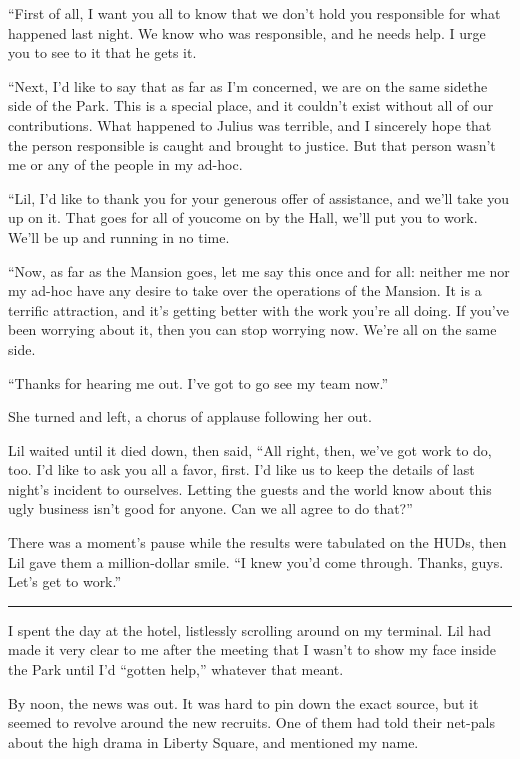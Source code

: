 “First of all, I want you all to know that we don't hold you
responsible for what happened last night. We know who was
responsible, and he needs help. I urge you to see to it that he
gets it.

“Next, I'd like to say that as far as I'm concerned, we are on the
same side{\dash}the side of the Park. This is a special place, and it
couldn't exist without all of our contributions. What happened to
Julius was terrible, and I sincerely hope that the person
responsible is caught and brought to justice. But that person
wasn't me or any of the people in my ad-hoc.

“Lil, I'd like to thank you for your generous offer of assistance,
and we'll take you up on it. That goes for all of you{\dash}come on by
the Hall, we'll put you to work. We'll be up and running in no
time.

“Now, as far as the Mansion goes, let me say this once and for all:
neither me nor my ad-hoc have any desire to take over the
operations of the Mansion. It is a terrific attraction, and it's
getting better with the work you're all doing. If you've been
worrying about it, then you can stop worrying now. We're all on the
same side.

“Thanks for hearing me out. I've got to go see my team now.”

She turned and left, a chorus of applause following her out.

Lil waited until it died down, then said, “All right, then, we've
got work to do, too. I'd like to ask you all a favor, first. I'd
like us to keep the details of last night's incident to ourselves.
Letting the guests and the world know about this ugly business
isn't good for anyone. Can we all agree to do that?”

There was a moment's pause while the results were tabulated on the
HUDs, then Lil gave them a million-dollar smile. “I knew you'd come
through. Thanks, guys. Let's get to work.”

\begin{center}\rule{1in}{0.4pt}\end{center}

I spent the day at the hotel, listlessly scrolling around on my
terminal. Lil had made it very clear to me after the meeting that I
wasn't to show my face inside the Park until I'd “gotten help,”
whatever that meant.

By noon, the news was out. It was hard to pin down the exact
source, but it seemed to revolve around the new recruits. One of
them had told their net-pals about the high drama in Liberty
Square, and mentioned my name.

